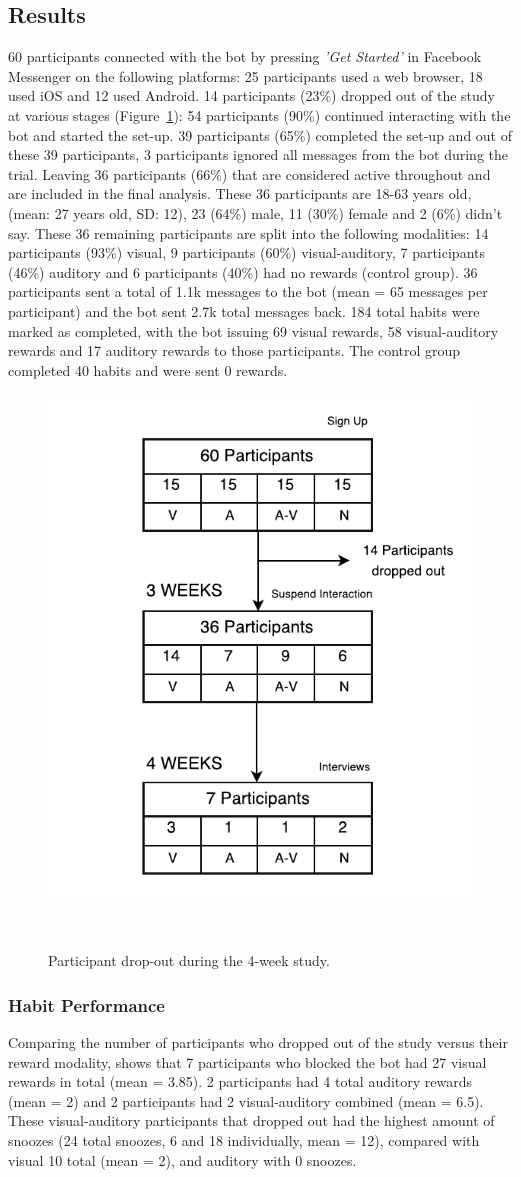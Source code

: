 \subsection{Results}
60 participants connected with the bot by pressing \textit{'Get Started'} in Facebook Messenger on the following platforms: 25 participants used a web browser, 18 used iOS and 12 used Android. 14 participants (23\%) dropped out of the study at various stages (Figure~\ref{fig:study_dropout}): 54 participants (90\%) continued interacting with the bot and started the set-up. 39 participants (65\%) completed the set-up and out of these 39 participants, 3 participants ignored all messages from the bot during the trial. Leaving 36 participants (66\%) that are considered active throughout and are included in the final analysis. These 36 participants are 18-63 years old, (mean: 27 years old, SD: 12), 23 (64\%) male, 11 (30\%) female and 2 (6\%) didn't say. These 36 remaining participants are split into the following modalities: 14 participants (93\%) visual, 9 participants (60\%) visual-auditory, 7 participants (46\%) auditory and 6 participants (40\%) had no rewards (control group). 36 participants sent a total of 1.1k messages to the bot (mean = 65 messages per participant) and the bot sent 2.7k total messages back. 184 total habits were marked as completed, with the bot issuing 69 visual rewards, 58 visual-auditory rewards and 17 auditory rewards to those participants. The control group completed 40 habits and were sent 0 rewards.

\begin{figure}[H]
  \centering
  \includegraphics[width=.4\columnwidth]{resources/figures/study-flow.pdf}
  \caption{Participant drop-out during the 4-week study.}~\label{fig:study_dropout}
\end{figure}

\subsubsection*{Habit Performance}
Comparing the number of participants who dropped out of the study versus their reward modality, shows that 7 participants who blocked the bot had 27 visual rewards in total (mean = 3.85). 2 participants had 4 total auditory rewards (mean = 2) and 2 participants had 2 visual-auditory combined (mean = 6.5). These visual-auditory participants that dropped out had the highest amount of snoozes (24 total snoozes, 6 and 18 individually, mean = 12), compared with visual 10 total (mean = 2), and auditory with 0 snoozes.

